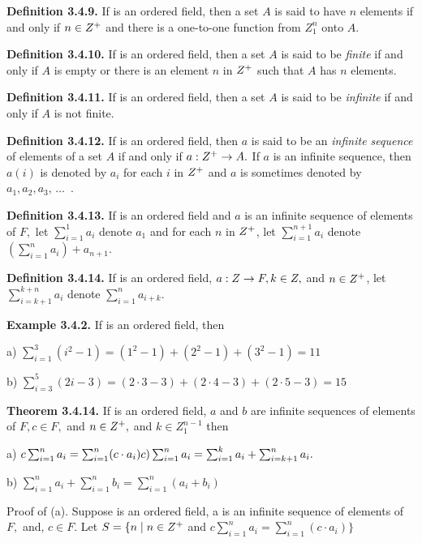 \begin{large}
\textbf{Definition 3.4.9.} If \of  is an ordered field, then a set $A$ is said to have $n$ elements if and
only if $n\in Z^{+}$ and there is a one-to-one function from $Z^{n}_{1}$ onto $A.$\nl

\textbf{Definition 3.4.10.} If \of is an ordered field, then a set $A$ is said to be \textit{finite} if and only if $A$
is empty or there is an element $n$ in $Z^{+} $ such that $A$ has $n$ elements. \nl

\textbf{Definition 3.4.11.} If \of  is an ordered field, then a set $A$ is said to be \textit{infinite} if and only if
$A$ is not finite. \nl

\textbf{Definition 3.4.12.} If \of  is an ordered field, then $a$ is said to be an \textit{infinite sequence} of
elements of a set $A$ if and only if $a : Z^{+} \to A.$ If $a$ is an infinite sequence, then $a(i)$ is denoted
by $a_{i}$ for each $i$ in $Z^{+}$ and $a$ is sometimes denoted by $a_{1}, a_{2}, a_{3},\, \dots \,\,\,.$\nl

\textbf{Definition 3.4.13.} If \of  is an ordered field and $a$ is an infinite sequence of elements of
$F,$ let  $\sum_{i=1}^{1}a_{i}$ denote $a_{1}$ and for each $n$ in $Z^{+}$, let
$\sum_{i=1}^{n+1}a_{i}$ denote $\left( \sum_{i=1}^{n}a_{i}\right) + a_{n+1} .$\nl

\textbf{Definition 3.4.14.} If \of is an ordered field, $a : Z \to F, k\in Z,$ and $n \in Z^{+}$, let $\sum_{i=k+1}^{k+n}a_{i}$ denote $\sum_{i=1}^{n}a_{i+k}.$\nl

\textbf{Example 3.4.2.} If \of is an ordered field, then

\newpage

a) $\sum_{i=1}^{3}(i^{2} - 1) = (1^2 - 1) + (2^2 - 1) + (3^2 - 1) = 11$ \nl

b)  $\sum_{i=3}^{5}(2i-3) = (2\cdot 3-3)+(2\cdot 4-3)+ (2\cdot 5 - 3) = 15 $\nl

\textbf{Theorem 3.4.14.} If \of is an ordered field, $a$ and $b$ are infinite sequences of elements of $F, c\in F,$ and $n\in Z^{+},$ and $k \in Z_{1}^{n-1}$ then\nl

a)  $c\sum_{i=1}^{n}a_{i} = \sum_{i=1}^{n}(c\cdot a_{i}) \hfill c)\sum_{i=1}^{n}a_{i} = \sum_{i=1}^{k}a_{i} +\sum_{i=k+1}^{n}a_{i}.$\nl

b)  $\sum_{i=1}^{n}a_{i} + \sum_{i=1}^{n}b_{i} = \sum_{i=1}^{n}(a_{i} + b_{i})$\nl


Proof of (a). Suppose \of  is an ordered field, a is an infinite sequence of elements of $F,$
and, $c\in F.$ \nl
Let $S= \{n \mid n\in Z^{+}$ and $c\sum_{i=1}^{n}a_{i} = \sum_{i=1}^{n}(c\cdot a_{i})\}$\nl


\end{large}

